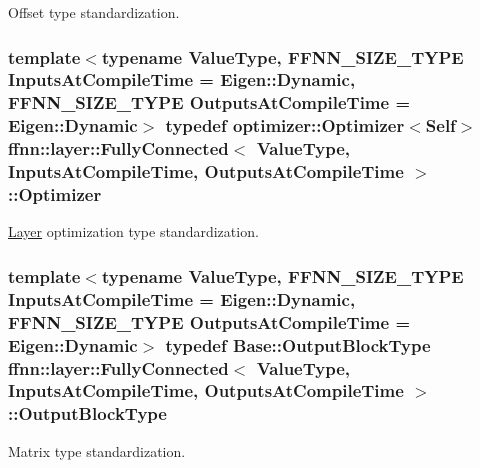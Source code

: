 Offset type standardization. 

\hypertarget{classffnn_1_1layer_1_1_fully_connected_a1d4b9ddaf2b993d3c9a62d7b3cca495f}{
\subsubsection[{Optimizer}]{\setlength{\rightskip}{0pt plus 5cm}template$<$typename Value\-Type, F\-F\-N\-N\-\_\-\-S\-I\-Z\-E\-\_\-\-T\-Y\-P\-E Inputs\-At\-Compile\-Time = Eigen\-::\-Dynamic, F\-F\-N\-N\-\_\-\-S\-I\-Z\-E\-\_\-\-T\-Y\-P\-E Outputs\-At\-Compile\-Time = Eigen\-::\-Dynamic$>$ typedef {\bf optimizer\-::\-Optimizer}$<${\bf Self}$>$ {\bf ffnn\-::layer\-::\-Fully\-Connected}$<$ Value\-Type, Inputs\-At\-Compile\-Time, Outputs\-At\-Compile\-Time $>$\-::{\bf Optimizer}}}\label{classffnn_1_1layer_1_1_fully_connected_a1d4b9ddaf2b993d3c9a62d7b3cca495f}


\hyperlink{classffnn_1_1layer_1_1_layer}{Layer} optimization type standardization. 

\hypertarget{classffnn_1_1layer_1_1_fully_connected_ac8c5ba1f20f470095c2c37f881f49814}{
\subsubsection[{Output\-Block\-Type}]{\setlength{\rightskip}{0pt plus 5cm}template$<$typename Value\-Type, F\-F\-N\-N\-\_\-\-S\-I\-Z\-E\-\_\-\-T\-Y\-P\-E Inputs\-At\-Compile\-Time = Eigen\-::\-Dynamic, F\-F\-N\-N\-\_\-\-S\-I\-Z\-E\-\_\-\-T\-Y\-P\-E Outputs\-At\-Compile\-Time = Eigen\-::\-Dynamic$>$ typedef {\bf Base\-::\-Output\-Block\-Type} {\bf ffnn\-::layer\-::\-Fully\-Connected}$<$ Value\-Type, Inputs\-At\-Compile\-Time, Outputs\-At\-Compile\-Time $>$\-::{\bf Output\-Block\-Type}}}\label{classffnn_1_1layer_1_1_fully_connected_ac8c5ba1f20f470095c2c37f881f49814}


Matrix type standardization. 

